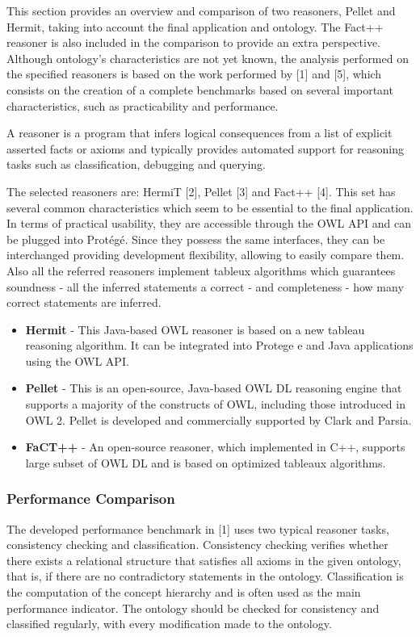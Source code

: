
This section provides an overview and comparison of two reasoners, Pellet and Hermit, taking into account the final application and ontology. The Fact++ reasoner is also included in the comparison to provide an extra perspective.
Although ontology's characteristics are not yet known, the analysis performed on the specified reasoners is based on the work performed by [1] and [5], which consists on the creation of a complete benchmarks based on several important characteristics, such as practicability and performance.

A reasoner is a program that infers logical consequences from a list of explicit asserted facts or axioms and typically provides automated support for reasoning tasks such as classification, debugging and querying.

The selected reasoners are: HermiT [2], Pellet [3] and Fact++ [4]. This set has several common characteristics which seem to be essential to the final application. In terms of practical usability, they are accessible through the OWL API and can be plugged into Protégé. Since they possess the same interfaces, they can be interchanged providing development flexibility, allowing to easily compare them. Also all the referred reasoners implement tableux algorithms which guarantees soundness - all the inferred statements a correct - and completeness - how many correct statements are inferred.

\begin{itemize}
\item \textbf{Hermit} - This Java-based OWL reasoner is based on a new tableau reasoning algorithm. It can be integrated into Protege e and Java applications using the OWL API.
\item \textbf{Pellet} - This is an open-source, Java-based OWL DL reasoning engine that supports a majority of the constructs of OWL, including those introduced in OWL 2. Pellet is developed and commercially supported by Clark and Parsia.
\item \textbf{FaCT++} - An open-source reasoner, which implemented in C++, supports large subset of OWL DL and is based on optimized tableaux algorithms.
\end{itemize}

\subsubsection{Performance Comparison}

The developed performance benchmark in [1] uses two typical reasoner tasks, consistency checking and classification. Consistency checking verifies whether there exists a relational structure that satisfies all axioms in the given ontology, that is, if there are no contradictory statements in the ontology. Classification is the computation of the concept hierarchy and is often used as the main performance indicator. The ontology should be checked for consistency and classified regularly, with every modification made to the ontology. 

